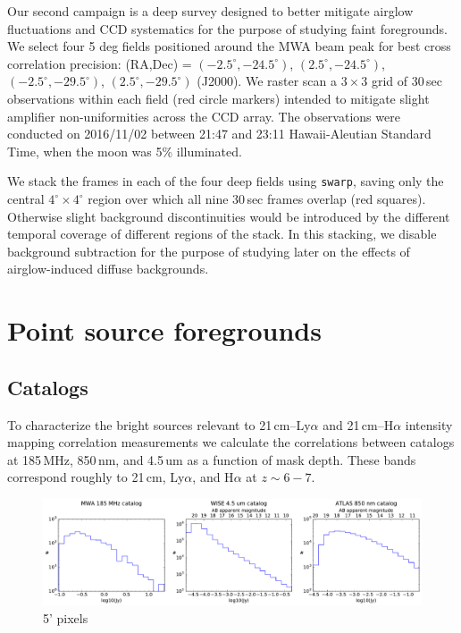 \documentclass{emulateapj}
\begin{document}

Our second campaign is a deep survey designed to better mitigate airglow fluctuations and CCD systematics for the purpose of studying faint foregrounds. We select four 5 deg fields positioned around the MWA beam peak for best cross correlation precision: (RA,Dec) = $(-2.5^\circ, -24.5^\circ)$, $(2.5^\circ, -24.5^\circ)$, $(-2.5^\circ, -29.5^\circ)$, $(2.5^\circ, -29.5^\circ)$ (J2000). We raster scan a $3\times3$ grid of 30\,sec observations within each field (red circle markers) intended to mitigate slight amplifier non-uniformities across the CCD array. The observations were conducted on 2016/11/02 between 21:47 and 23:11 Hawaii-Aleutian Standard Time, when the moon was 5\% illuminated.

We stack the frames in each of the four deep fields using {\tt swarp}, saving only the central $4^\circ\times 4^\circ$ region over which all nine 30\,sec frames overlap (red squares). Otherwise slight background discontinuities would be introduced by the different temporal coverage of different regions of the stack. In this stacking, we disable background subtraction for the purpose of studying later on the effects of airglow-induced diffuse backgrounds.




\section{Point source foregrounds}

\subsection{Catalogs}

To characterize the bright sources relevant to 21\,cm--Ly$\alpha$ and  21\,cm--H$\alpha$ intensity mapping correlation measurements we calculate the correlations between catalogs at 185\,MHz, 850\,nm, and 4.5\,um as a function of mask depth. These bands correspond roughly to 21\,cm, Ly$\alpha$, and H$\alpha$ at $z\sim6-7$. 

\begin{figure}[t]
\centering
\includegraphics[width=6.5in]{images/catalog_histograms.pdf}
\caption{5' pixels}
\label{fig:cataloghistograms}
\end{figure}
\end{document}
